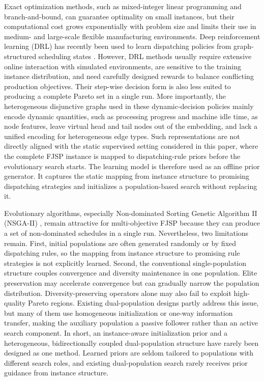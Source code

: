 \documentclass[pdflatex,iicol,Numbered,sn-basic]{sn-jnl}
\begin{document}
Exact optimization methods, such as mixed-integer linear programming and branch-and-bound, can guarantee optimality on small instances, but their computational cost grows exponentially with problem size and limits their use in medium- and large-scale flexible manufacturing environments.
Deep reinforcement learning (DRL) has recently been used to learn dispatching policies from graph-structured scheduling states \cite{zhang2020learning,song2022flexible,lei2022multi,wan2024flexible}. However, DRL methods usually require extensive online interaction with simulated environments, are sensitive to the training instance distribution, and need carefully designed rewards to balance conflicting production objectives. Their step-wise decision form is also less suited to producing a complete Pareto set in a single run. More importantly, the heterogeneous disjunctive graphs used in these dynamic-decision policies mainly encode dynamic quantities, such as processing progress and machine idle time, as node features, leave virtual head and tail nodes out of the embedding, and lack a unified encoding for heterogeneous edge types. Such representations are not directly aligned with the static supervised setting considered in this paper, where the complete FJSP instance is mapped to dispatching-rule priors before the evolutionary search starts.
The learning model is therefore used as an offline prior generator. It captures the static mapping from instance structure to promising dispatching strategies and initializes a population-based search without replacing it.

Evolutionary algorithms, especially Non-dominated Sorting Genetic Algorithm II (NSGA-II) \cite{deb2002fast}, remain attractive for multi-objective FJSP because they can produce a set of non-dominated schedules in a single run. Nevertheless, two limitations remain.
First, initial populations are often generated randomly or by fixed dispatching rules, so the mapping from instance structure to promising rule strategies is not explicitly learned.
Second, the conventional single-population structure couples convergence and diversity maintenance in one population. Elite preservation may accelerate convergence but can gradually narrow the population distribution. Diversity-preserving operators alone may also fail to exploit high-quality Pareto regions.
Existing dual-population designs partly address this issue, but many of them use homogeneous initialization or one-way information transfer, making the auxiliary population a passive follower rather than an active search component.
In short, an instance-aware initialization prior and a heterogeneous, bidirectionally coupled dual-population structure have rarely been designed as one method. Learned priors are seldom tailored to populations with different search roles, and existing dual-population search rarely receives prior guidance from instance structure.
\end{document}
